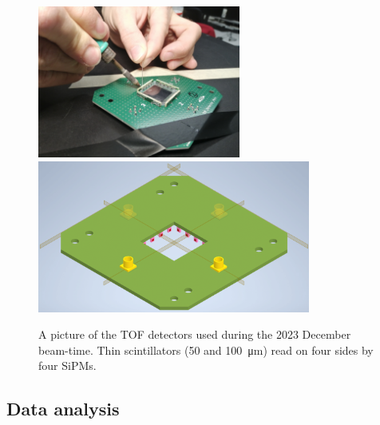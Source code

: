 \begin{refsection}
        \begin{figure}
            \centering
            \includegraphics[height=5cm]{Figures/muEDM_Dec2023/TOF_soldering.jpg}
            \includegraphics[height=5cm]{Figures/muEDM_Dec2023/TOF_CAD.png}
            \caption[muEDM 2023: TOF detector soldering.]{A picture of the TOF detectors used during the 2023 December beam-time. Thin scintillators (50 and \SI{100}{\micro m}) read on four sides by four SiPMs.}
            \label{fig:muEDM:bt2023:TOFPython}
        \end{figure}
        
    \subsection{Data analysis}

\printbibliography[
    heading = bibliographychapter,
    title=Bibliography on muEDM entrance detector
]

\end{refsection}



